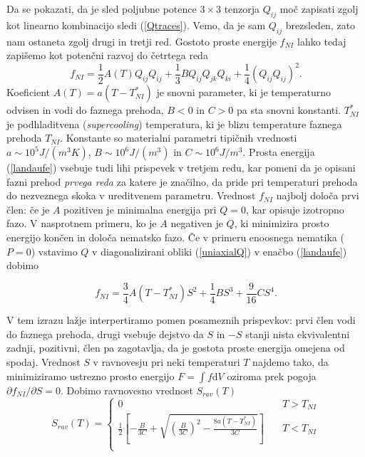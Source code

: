 \documentclass[longbibliography,slovene,a4paper,12pt]{book}
\newcommand{\dd}{\text{d}}
\begin{document}
Da se pokazati, da je sled poljubne potence $3\times 3$ tenzorja $Q_{ij}$ moč zapisati zgolj kot linearno kombinacijo sledi (\ref{Qtraces}). Vemo, da je sam $Q_{ij}$ brezsleden, zato nam ostaneta zgolj drugi in tretji red\cite{gramsbergen}. Gostoto proste energije $f_{NI}$ lahko tedaj zapišemo kot potenčni razvoj do četrtega reda
\begin{equation}
f_{NI} = \frac{1}{2} A(T) Q_{ij}Q_{ij} + \frac{1}{3} B Q_{ij}Q_{jk}Q_{ki} + \frac{1}{4}(Q_{ij}Q_{ij})^2.
\label{landaufe}
\end{equation}
Koeficient $A(T) = a(T-T_{NI}^*)$ je snovni parameter, ki je temperaturno odvisen in vodi do faznega prehoda, $B < 0$ in $C > 0$ pa sta snovni konstanti. $T_{NI}^*$ je podhladitvena (\emph{supercooling}) temperatura, ki je blizu temperature faznega prehoda $T_{NI}$. Konstante so materialni parametri tipičnih vrednosti $a\sim 10^5J/(m^3K)$, $B\sim 10^6 J/(m^3)$ in $C\sim10^6J/m^3$\cite{ravnik}. Prosta energija (\ref{landaufe}) vsebuje tudi lihi prispevek v tretjem redu, kar pomeni da je opisani fazni prehod \emph{prvega reda} za katere je značilno, da pride pri temperaturi prehoda do nezveznega skoka v ureditvenem parametru. Vrednost $f_{NI}$ najbolj določa prvi člen: če je $A$ pozitiven je minimalna energija pri $Q=0$, kar opisuje izotropno fazo. V nasprotnem primeru, ko je $A$ negativen je $Q$, ki minimizira prosto energijo končen in določa nematsko fazo. Če v primeru enoosnega nematika ($P = 0$) vstavimo $Q$ v diagonalizirani obliki (\ref{uniaxialQ}) v enačbo (\ref{landaufe}) dobimo

\begin{equation}
f_{NI} = \frac{3}{4}A(T-T_{NI}^*)S^2 + \frac{1}{4}BS^3 + \frac{9}{16}CS^4.
\end{equation}

V tem izrazu lažje interpertiramo pomen posameznih prispevkov: prvi člen vodi do faznega prehoda, drugi vsebuje dejstvo da $S$ in $-S$ stanji nista ekvivalentni zadnji, pozitivni, člen pa zagotavlja, da je gostota proste energija omejena od spodaj. Vrednost $S$ v ravnovesju pri neki temperaturi $T$ najdemo tako, da minimiziramo ustrezno prosto energijo $F=\int f \dd V$ oziroma prek pogoja $\partial f_{NI}/\partial S = 0$. Dobimo ravnovesno vrednost $S_{rav} (T)$
\[   
S_{rav}(T) = 
     \begin{cases}
       0 &\quad T>T_{NI}\\
       \frac{1}{2} \left [-\frac{B}{3C} + \sqrt{\left (\frac{B}{3C} \right)^2 - \frac{8a(T-T_{NI}^*)}{3C}}  \right ] &\quad T<T_{NI} \\
       \label{Stransition}
     \end{cases}
\]
\end{document}
